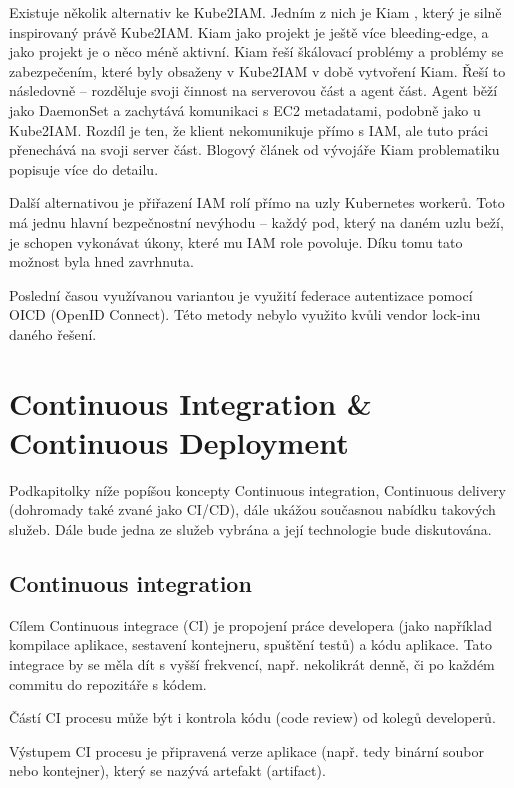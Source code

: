 \documentclass[thesis=M,czech]{FITthesis}[2019/12/23]
\theoremstyle{plain}
\theoremstyle{definition}
\begin{document}
Existuje několik alternativ ke Kube2IAM. Jedním z nich je Kiam \cite{kiam-github}, který je silně inspirovaný právě Kube2IAM. Kiam jako projekt je ještě více bleeding-edge, a jako projekt je o něco méně aktivní. Kiam řeší škálovací problémy a problémy se zabezpečením, které byly obsaženy v Kube2IAM v době vytvoření Kiam. Řeší to následovně -- rozděluje svoji činnost na serverovou část a agent část. Agent běží jako DaemonSet a zachytává komunikaci s EC2 metadatami, podobně jako u Kube2IAM. Rozdíl je ten, že klient nekomunikuje přímo s IAM, ale tuto práci přenechává na svoji server část. Blogový článek od vývojáře Kiam problematiku popisuje více do detailu. \cite{kiam-post} 


Další alternativou je přiřazení IAM rolí přímo na uzly Kubernetes workerů. Toto má jednu hlavní bezpečnostní nevýhodu -- každý pod, který na daném uzlu beží, je schopen vykonávat úkony, které mu IAM role povoluje. Díku tomu tato možnost byla hned zavrhnuta.  

Poslední časou využívanou variantou je využití federace autentizace pomocí OICD (OpenID Connect). \cite{eks-oidc} Této metody nebylo využito kvůli vendor lock-inu daného řešení.





\section{Continuous Integration \& Continuous Deployment}

Podkapitolky níže popíšou koncepty Continuous integration, Continuous delivery (dohromady také zvané jako CI/CD), dále ukážou současnou nabídku takových služeb. Dále bude jedna ze služeb vybrána a její technologie bude diskutována.

\subsection{Continuous integration}

Cílem Continuous integrace (CI) \cite{fowler-ci}je propojení práce developera (jako například kompilace aplikace, sestavení kontejneru, spuštění testů) a kódu aplikace. Tato integrace by se měla dít s vyšší frekvencí, např. nekolikrát denně, či po každém commitu do repozitáře s kódem.

Částí CI procesu může být i kontrola kódu (code review) od kolegů developerů.

Výstupem CI procesu je připravená verze aplikace (např. tedy binární soubor nebo kontejner), který se nazývá artefakt (artifact).
\end{document}

